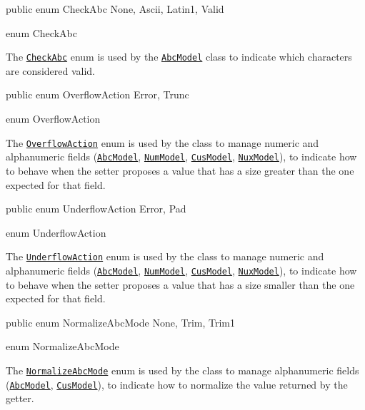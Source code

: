 \documentclass[a4paper,10pt]{report}
\newenvironment{elisting}[1][H]
  {\captionsetup{aboveskip=0pt}\begin{listing}[#1]}
  {\end{listing}%
}
\begin{document}
\begin{elisting}
\begin{javacode}
public enum CheckAbc { None, Ascii, Latin1, Valid }
\end{javacode}
\caption{enum CheckAbc}\label{lst:CheckAbc}
\end{elisting}
The \hyperref[lst:CheckAbc]{\texttt{CheckAbc}} enum is used by the 
\hyperref[lst:AbcModel]{\texttt{AbcModel}} class to indicate which characters 
are considered valid.

\begin{elisting}
\begin{javacode}
public enum OverflowAction { Error, Trunc }
\end{javacode}
\caption{enum OverflowAction}\label{lst:OverflowAction}
\end{elisting}
The \hyperref[lst:OverflowAction]{\texttt{OverflowAction}} enum is used by the 
class to manage numeric and alphanumeric fields 
(\hyperref[lst:AbcModel]{\texttt{AbcModel}},
\hyperref[lst:NumModel]{\texttt{NumModel}},
\hyperref[lst:CusModel]{\texttt{CusModel}},
\hyperref[lst:NuxModel]{\texttt{NuxModel}}), to indicate how to behave when the 
setter proposes a value that has a size greater than the one expected for that 
field.

\begin{elisting}
\begin{javacode}
public enum UnderflowAction { Error, Pad }
\end{javacode}
\caption{enum UnderflowAction}\label{lst:UnderflowAction}
\end{elisting}
The \hyperref[lst:UnderflowAction]{\texttt{UnderflowAction}} enum is used by the 
class to manage numeric and alphanumeric fields 
(\hyperref[lst:AbcModel]{\texttt{AbcModel}},
\hyperref[lst:NumModel]{\texttt{NumModel}},
\hyperref[lst:CusModel]{\texttt{CusModel}},
\hyperref[lst:NuxModel]{\texttt{NuxModel}}), to indicate how to behave when the 
setter proposes a value that has a size smaller than the one expected for that 
field.

\begin{elisting}
\begin{javacode}
public enum NormalizeAbcMode { None, Trim, Trim1 }
\end{javacode}
\caption{enum NormalizeAbcMode}\label{lst:NormalizeAbcMode}
\end{elisting}
The \hyperref[lst:NormalizeAbcMode]{\texttt{NormalizeAbcMode}} enum is used by 
the class to manage alphanumeric fields 
(\hyperref[lst:AbcModel]{\texttt{AbcModel}},
\hyperref[lst:CusModel]{\texttt{CusModel}}), to indicate how to normalize the 
value returned by the getter.
\end{document}
